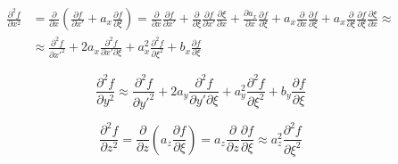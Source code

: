 \begin{equation*}
    \begin{split}
        \frac
            {\partial^2 f}
            {\partial x^2}
        &
        =
        \frac
            {\partial}
            {\partial x}
        \left(
            \frac
                {\partial f}
                {\partial x'}
            +
            a_{x}
            \frac
                {\partial f}
                {\partial \xi}
        \right)
        =
        \frac
            {\partial}
            {\partial x}
        \frac
            {\partial f}
            {\partial x'}
        +
        \frac
            {\partial}
            {\partial \xi}
        \frac
            {\partial f}
            {\partial x'}
        \frac
            {\partial \xi}
            {\partial x}
        +
        \frac
            {\partial a_{x}}
            {\partial x}
        \frac
            {\partial f}
            {\partial \xi}
        +
        a_{x}
        \frac
            {\partial}
            {\partial x}
        \frac
            {\partial f}
            {\partial \xi}
        +
        a_{x}
        \frac
            {\partial}
            {\partial \xi}
        \frac
            {\partial f}
            {\partial \xi}
        \frac
            {\partial \xi}
            {\partial x}
        \approx
        \\
        &
        \approx
        \frac
            {\partial^2 f}
            {\partial x'^2}
        +
        2
        a_{x}
        \frac
            {\partial^2 f}
            {\partial x' \partial \xi}
        +
        a^2_{x}
        \frac
            {\partial^2 f}
            {\partial \xi^2}
        +
        b_{x}
        \frac
            {\partial f}
            {\partial \xi}
    \end{split}
\end{equation*}

\begin{equation*}
    \frac
        {\partial^2 f}
        {\partial y^2}
    \approx
    \frac
        {\partial^2 f}
        {\partial y'^2}
    +   
    2
    a_{y}
    \frac
        {\partial^2 f}
        {\partial y' \partial \xi}
    +
    a^2_{y}
    \frac
        {\partial^2 f}
        {\partial \xi^2}
    +
    b_{y}
    \frac
        {\partial f}
        {\partial \xi}
\end{equation*}

\begin{equation*}
    \frac
        {\partial^2 f}
        {\partial z^2}
    =
    \frac
        {\partial}
        {\partial z}
    \left(
        a_{z}
        \frac
            {\partial f}
            {\partial \xi}
    \right)
    =
    a_{z}
    \frac
        {\partial}
        {\partial z}
    \frac
        {\partial f}
        {\partial \xi}
    \approx
    a^2_{z}
    \frac
        {\partial^2 f}
        {\partial \xi^2}
\end{equation*}

